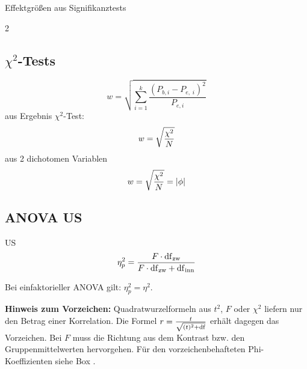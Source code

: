 \begin{formulaBox}{Effektgrößen aus Signifikanztests}{}
\begin{multicols}{2}
\subsection*{$\chi^2$-Tests}
$$w=\sqrt{\sum\limits_{i=1}^k\frac{(P_{b,i}-P_{e,\;i})^2}{P_{e,i}}}$$
aus Ergebnis $\chi^2$-Test:
$$w=\sqrt{\frac{\chi^2}{N}}$$
aus 2 dichotomen Variablen
$$w=\sqrt{\frac{\chi^2}{N}}=|\phi|$$

\subsection*{ANOVA US}

US
\begin{align*}
\eta_p^2&=\frac{F\cdot \mathrm{df}_{\mathrm{zw}}}{F\cdot \mathrm{df}_{\mathrm{zw}}+\mathrm{df}_{\mathrm{inn}}}\\
\end{align*}

Bei einfaktorieller ANOVA gilt: $\eta_p^2=\eta^2$.
\par\vspace{0.6em}\textbf{Hinweis zum Vorzeichen:} Quadratwurzelformeln aus $t^2$, $F$ oder $\chi^2$ liefern nur den Betrag einer Korrelation. Die Formel $r=\frac{t}{\sqrt{(t)^2+\mathrm{df}}}$ erhält dagegen das Vorzeichen. Bei $F$ muss die Richtung aus dem Kontrast bzw. den Gruppenmittelwerten hervorgehen. Für den vorzeichenbehafteten Phi-Koeffizienten siehe Box .

\end{multicols}
\end{formulaBox}

